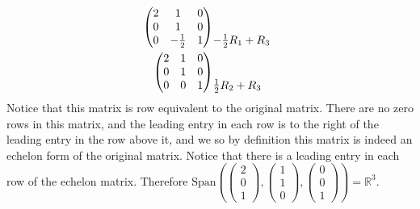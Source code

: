 \documentclass[12pt]{article}
\newenvironment{problem}[2][Problem]
{
	\begin{trivlist} 
		\item[\hskip \labelsep {\bfseries #1 #2:}]
	}
{
	\end{trivlist}
	}
\newenvironment{solution}[1][Solution]
{
	\begin{trivlist} 
		\item[\hskip \labelsep {\itshape #1:}]
	}
	{
	\end{trivlist}
}
\begin{document}
\begin{problem}{1}
\begin{solution}
\begin{align*}
&\begin{matrix}\hphantom{1}\\\hphantom{1}\\\hphantom{1}\end{matrix}\\
\begin{pmatrix}2&1&0\\0&1&0\\0&-\frac{1}{2}&1\end{pmatrix}
&\begin{matrix}\hphantom{1}\\\hphantom{1}\\-\frac{1}{2}R_1+R_3\hphantom{1}\end{matrix}\\
\begin{pmatrix}2&1&0\\0&1&0\\0&0&1\end{pmatrix}
&\begin{matrix}\hphantom{1}\\\hphantom{1}\\\frac{1}{2}R_2+R_3\hphantom{1}\end{matrix}\\
\end{align*}
Notice that this matrix is row equivalent to the original matrix. There are no zero rows in this matrix, and the leading entry in each row is to the right of the leading entry in the row above it, and we so by definition this matrix is indeed an echelon form of the original matrix. Notice that there is a leading entry in each row of the echelon matrix. Therefore $\text{Span}\left(\begin{pmatrix}2\\0\\1\end{pmatrix}, \begin{pmatrix}1\\1\\0\end{pmatrix}, \begin{pmatrix}0\\0\\1\end{pmatrix}\right)=\mathbb{R}^3$.
\end{solution}
\end{problem}
\end{document}
